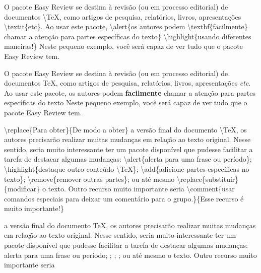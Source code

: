 \documentclass[12pt,openright,oneside,a4paper,sumario=tradicional,brazil]{abntex2}
\begin{document}
\begin{minipage}{0.45\textwidth}
O pacote Easy Review se destina à revisão (ou em processo editorial) de documentos \textbackslash TeX, como artigos de pesquisa, relatórios, livros, apresentações \textbackslash textit\{etc\}. Ao usar este pacote, \textbackslash alert\{os autores podem \textbackslash textbf\{facilmente\} chamar a atenção para partes específicas do texto\} \textbackslash highlight\{usando diferentes maneiras!\} Neste pequeno exemplo, você será capaz de ver tudo que o pacote Easy Review tem.
\end{minipage}\hfill
\begin{minipage}{0.45\textwidth}
O pacote Easy Review se destina à revisão (ou em processo editorial) de documentos \TeX, como artigos de pesquisa, relatórios, livros, apresentações \textit{etc}. Ao usar este pacote, \alert{os autores podem \textbf{facilmente} chamar a atenção para partes específicas do texto}  Neste pequeno exemplo, você será capaz de ver tudo que o pacote Easy Review tem.
\end{minipage}\vspace{1cm}
\begin{minipage}{0.45\textwidth}
\textbackslash replace\{Para obter\}\{De modo a obter\} a versão final do documento \textbackslash TeX, os autores precisarão realizar muitas mudanças em relação ao texto original. Nesse sentido, seria muito interessante ter um pacote disponível que pudesse facilitar a tarefa de destacar algumas mudanças: \textbackslash alert\{alerta para uma frase ou período\}; \textbackslash highlight\{destaque outro conteúdo \textbackslash TeX\}; \textbackslash add\{adicione partes específicas no texto\}; \textbackslash remove\{remover outras partes\}; ou até mesmo \textbackslash replace\{substituir\}\{modificar\} o texto. Outro recurso muito importante seria \textbackslash comment\{usar comandos especiais para deixar um comentário para o grupo.\}\{Esse recurso é muito importante!\}
\end{minipage}
\hfill
\begin{minipage}{0.45\textwidth}
 a versão final do documento \TeX, os autores precisarão realizar muitas mudanças em relação ao texto original. Nesse sentido, seria muito interessante ter um pacote disponível que pudesse facilitar a tarefa de destacar algumas mudanças: \alert{alerta para uma frase ou período}; ; ; ; ou até mesmo  o texto. Outro recurso muito importante seria 
\end{minipage}
\end{document}
